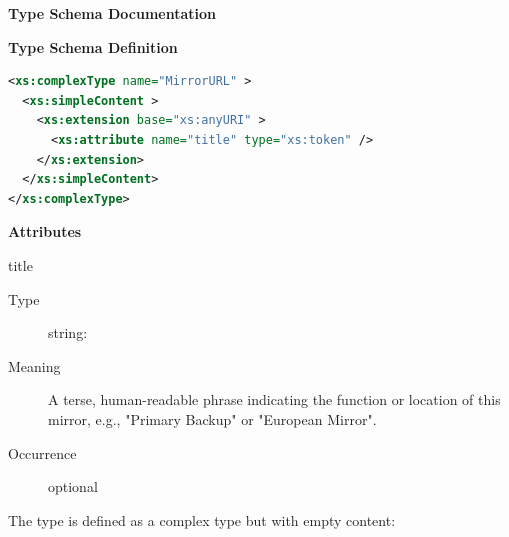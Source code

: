 \documentclass[11pt,a4paper]{ivoa}
\begin{document}
\begin{generated}
\begingroup
      	\renewcommand*\descriptionlabel[1]{%
      	\hbox to 5.5em{\emph{#1}\hfil}}\vspace{2ex}\noindent\textbf{ Type Schema Documentation}


\vspace{1ex}\noindent\textbf{ Type Schema Definition}

\begin{lstlisting}[language=XML,basicstyle=\footnotesize]
<xs:complexType name="MirrorURL" >
  <xs:simpleContent >
    <xs:extension base="xs:anyURI" >
      <xs:attribute name="title" type="xs:token" />
    </xs:extension>
  </xs:simpleContent>
</xs:complexType>
\end{lstlisting}

\vspace{0.5ex}\noindent\textbf{ Attributes}

\begingroup\small\begin{bigdescription}
\item[title]
\begin{description}
\item[Type] string: 
\item[Meaning] 
                  A terse, human-readable phrase indicating the function
                  or location of this mirror, e.g., {"}Primary Backup{"} or
                  {"}European Mirror{"}.
               
\item[Occurrence] optional
\end{description}


\end{bigdescription}\endgroup

\endgroup
\end{generated}



The  type is
defined as a complex type but with empty content:
\end{document}
